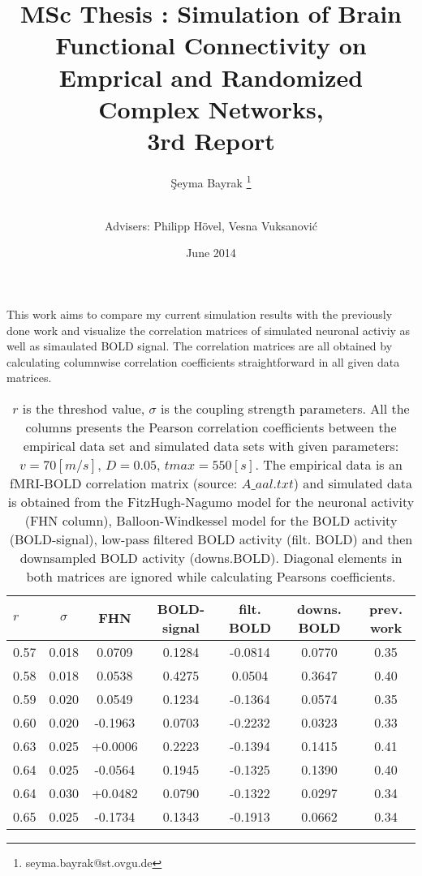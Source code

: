\documentclass[12pt]{article}
\title{MSc Thesis : Simulation of Brain Functional Connectivity on Emprical and Randomized Complex Networks, \\ 3rd Report}
\author[1]{\c{S}eyma Bayrak \thanks{seyma.bayrak@st.ovgu.de}}
\author[ ]{\\ Advisers: Philipp H\"{o}vel, Vesna Vuksanovi\'c}
\affil[1]{\footnotesize{Integrative Neuroscience MSc, Otto von Guericke University, Magdeburg}}
\date{June 2014}
\begin{document}
   \maketitle
This work aims to compare my current simulation results with the previously done work and visualize the correlation matrices of simulated neuronal activiy as well as simaulated BOLD signal. The correlation matrices are all obtained by calculating columnwise correlation coefficients straightforward in all given data matrices. 

\newpage

\begin{table}[h]
		\caption{$r$ is the threshod value, $\sigma$ is the coupling strength parameters. All the columns presents the Pearson correlation coefficients between the empirical data set and simulated data sets with given parameters: $v=70[m/s]$, $D=0.05$, $tmax=550[s]$. The empirical data is an fMRI-BOLD correlation matrix (source: $A\_aal.txt$) and simulated data is obtained from the FitzHugh-Nagumo model for the neuronal activity (FHN column), Balloon-Windkessel model for the BOLD activity (BOLD-signal), low-pass filtered BOLD activity (filt. BOLD) and then downsampled BOLD activity (downs.BOLD). Diagonal elements in both matrices are ignored while calculating Pearsons coefficients. 	}
	\begin{tabular}{l | c | c | c | c | c | c } \hline
$r$  &  $\sigma$ & FHN     & BOLD-signal & filt. BOLD    & downs. BOLD & prev. work  \\ \hline \hline
0.57 &  0.018 	 & 0.0709  &	0.1284	 &	-0.0814		 &	0.0770	   & 0.35   	    \\ \hline
0.58 &  0.018    & 0.0538  &	0.4275	 &	0.0504		 &	0.3647	   & 0.40			\\ \hline
0.59 &  0.020    & 0.0549  &	0.1234	 &	-0.1364		 &	0.0574	   & 0.35			\\ \hline
0.60 &  0.020    & -0.1963 &	0.0703	 &	-0.2232		 &	0.0323	   & 0.33			\\ \hline
0.63 &  0.025    & +0.0006 &	0.2223	 &	-0.1394		 &	0.1415	   & 0.41			\\ \hline
0.64 &  0.025    & -0.0564 &	0.1945	 &	-0.1325		 &	0.1390	   & 0.40			\\ \hline
0.64 &  0.030    & +0.0482 &	0.0790	 &	-0.1322		 &	0.0297	   & 0.34			\\ \hline
0.65 &  0.025    & -0.1734 &	0.1343	 &	-0.1913		 &	0.0662	   & 0.34    		\\ \hline
	\end{tabular}  
\end{table}    
\end{document}
